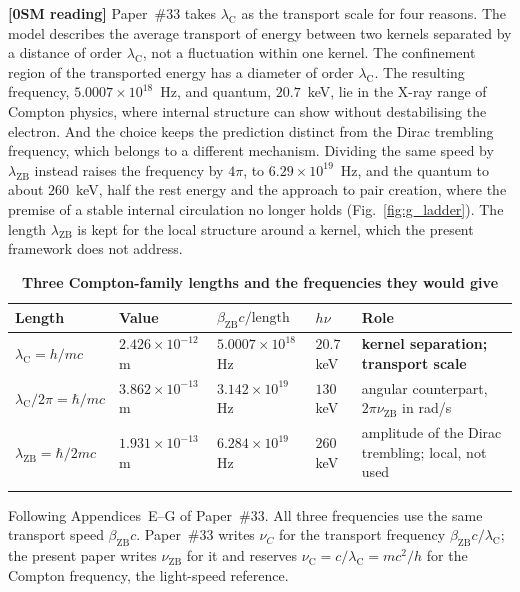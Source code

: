 \documentclass[%
 reprint, amsmath,amssymb, aps, prb, ]{revtex4-2}
\numberwithin{equation}{section}
\newcommand{\betaZB}{\beta_{\text{ZB}}}
\newcommand{\lambdaC}{\lambda_{\text{C}}}
\newcommand{\nuZB}{\nu_{\text{ZB}}}
\newcommand{\nuC}{\nu_{\text{C}}}
\begin{document}
\textbf{[0SM reading]} Paper~\#33 takes $\lambdaC$ as the transport scale for four reasons. The model describes the average transport of energy between two kernels separated by a distance of order $\lambdaC$, not a fluctuation within one kernel. The confinement region of the transported energy has a diameter of order $\lambdaC$. The resulting frequency, $5.0007\times10^{18}$~Hz, and quantum, $20.7$~keV, lie in the X-ray range of Compton physics, where internal structure can show without destabilising the electron. And the choice keeps the prediction distinct from the Dirac trembling frequency, which belongs to a different mechanism. Dividing the same speed by $\lambda_{\text{ZB}}$ instead raises the frequency by $4\pi$, to $6.29\times10^{19}$~Hz, and the quantum to about $260$~keV, half the rest energy and the approach to pair creation, where the premise of a stable internal circulation no longer holds (Fig.~\ref{fig:g_ladder}). The length $\lambda_{\text{ZB}}$ is kept for the local structure around a kernel, which the present framework does not address.

\begin{table}[t!]
\centering
\caption{\textbf{Three Compton-family lengths and the frequencies they would give}}
\label{tab:g_scales}
\renewcommand{\arraystretch}{1.4}
\setlength{\tabcolsep}{8pt}
\begin{tabular}{>{\raggedright\arraybackslash}p{3.4cm}>{\raggedright\arraybackslash}p{2.6cm}>{\raggedright\arraybackslash}p{2.6cm}>{\raggedright\arraybackslash}p{1.6cm}>{\raggedright\arraybackslash}p{4.0cm}}
\toprule
\textbf{Length} & \textbf{Value} & \textbf{$\betaZB c/\text{length}$} & \textbf{$h\nu$} & \textbf{Role} \\
\midrule
$\lambdaC = h/mc$ & $2.426\times10^{-12}$\,m & $5.0007\times10^{18}$\,Hz & $20.7$\,keV & \textcolor{pass}{\textbf{kernel separation; transport scale}} \\
\addlinespace[0.3cm]
$\lambdaC/2\pi = \hbar/mc$ & $3.862\times10^{-13}$\,m & $3.142\times10^{19}$\,Hz & $130$\,keV & angular counterpart, $2\pi\nuZB$ in rad/s \\
\addlinespace[0.3cm]
$\lambda_{\text{ZB}} = \hbar/2mc$ & $1.931\times10^{-13}$\,m & $6.284\times10^{19}$\,Hz & $260$\,keV & amplitude of the Dirac trembling; local, not used \\
\addlinespace[0.2cm]
\bottomrule
\end{tabular}
\vspace{0.2cm}
\begin{minipage}{0.95\textwidth}
\justifying\footnotesize
Following Appendices~E--G of Paper~\#33. All three frequencies use the same transport speed $\betaZB c$. Paper~\#33 writes $\nu_C$ for the transport frequency $\betaZB c/\lambdaC$; the present paper writes $\nuZB$ for it and reserves $\nuC = c/\lambdaC = mc^{2}/h$ for the Compton frequency, the light-speed reference.
\end{minipage}
\end{table}
\end{document}
